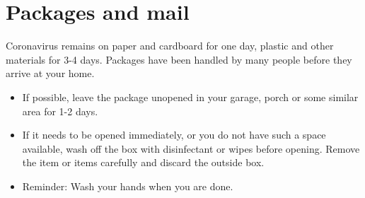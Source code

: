 \documentclass[onecolumn,journal]{IEEEtran}
\begin{document}
\begin{multicols}{2}
\begin{itemize}
\end{itemize}

\section*{Packages and mail}
Coronavirus remains on paper and cardboard for one day, plastic and other materials for 3-4 days. Packages have been handled by many people before they arrive at your home. 
\begin{itemize}
    \item If possible, leave the package unopened in  your garage, porch or some similar area for 1-2 days. 
    \item If it needs to be opened immediately, or you do not have such a space available, wash off the box with disinfectant or wipes before opening. Remove the item or items carefully and discard the outside box. 
    \item Reminder: Wash your hands when you are done. 
\end{itemize}
\end{multicols}


	
% 
\end{document}
